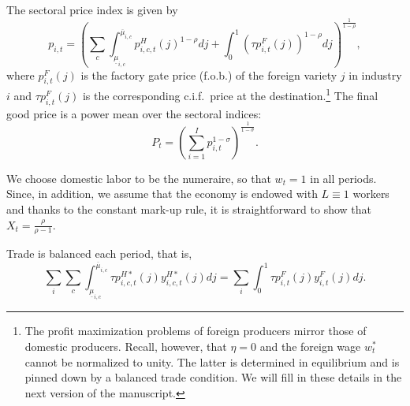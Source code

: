 \documentclass[onehalfspacing,11pt]{article}
\begin{document}
The sectoral price index is given by
\begin{equation}
\label{ }
p_{i,t} = \left( \sum_c \int_{\underline{\mu}_{i,c}}^{\overline{\mu}_{i,c}} p_{i,c,t}^H(j)^{1-\rho} dj + \int_0^1 \left( \tau p_{i,t}^F(j) \right)^{1-\rho} dj \right)^{\frac{1}{1-\rho}},
\end{equation}
where $p_{i,t}^F(j)$ is the factory gate price (f.o.b.) of the foreign variety $j$ in industry $i$ and $\tau p_{i,t}^F(j)$ is the corresponding c.i.f.~price at the destination.\footnote{The profit maximization problems of foreign producers mirror those of domestic producers. Recall, however, that $\eta=0$ and the foreign wage $w_t^*$ cannot be normalized to unity. The latter is determined in equilibrium and is pinned down by a balanced trade condition. We will fill in these details in the next version of the manuscript.} The final good price is a power mean over the sectoral indices:
\begin{equation}
\label{ }
P_t = \left( \sum_{i=1}^I p_{i,t}^{1-\sigma} \right)^{\frac{1}{1-\sigma}}.
\end{equation}


We choose domestic labor to be the numeraire, so that $w_t=1$ in all periods. Since, in addition, we assume that the economy is endowed with $L \equiv 1$ workers and thanks to the constant mark-up rule, it is straightforward to show that $X_t = \frac{\rho}{\rho-1}$.

Trade is balanced each period, that is,
\begin{equation}
\sum_i \sum_c \int_{\underline{\mu}_{i,c}}^{\overline{\mu}_{i,c}} \tau p_{i,c,t}^{H*}(j)  y_{i,c,t}^{H*}(j) dj = 
\sum_i \int_0^1 \tau p_{i,t}^{F}(j) y_{i,t}^{F}(j) dj.  \label{eq:trade_balance}
\end{equation}
\end{document}
